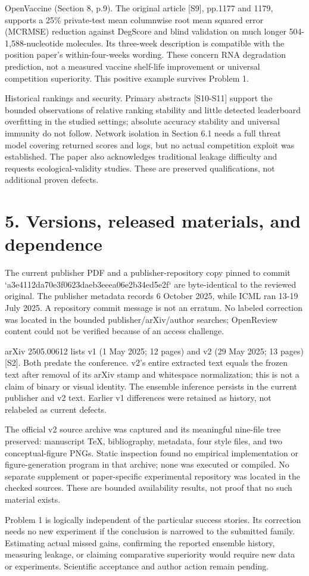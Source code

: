 \documentclass[10pt]{article}
\begin{document}
OpenVaccine (Section 8, p.9). The original article [S9], pp.1177 and 1179, supports a 25\% private-test mean columnwise root mean squared error (MCRMSE) reduction against DegScore and blind validation on much longer 504-1,588-nucleotide molecules. Its three-week description is compatible with the position paper’s within-four-weeks wording. These concern RNA degradation prediction, not a measured vaccine shelf-life improvement or universal competition superiority. This positive example survives Problem 1.\par
Historical rankings and security. Primary abstracts [S10-S11] support the bounded observations of relative ranking stability and little detected leaderboard overfitting in the studied settings; absolute accuracy stability and universal immunity do not follow. Network isolation in Section 6.1 needs a full threat model covering returned scores and logs, but no actual competition exploit was established. The paper also acknowledges traditional leakage difficulty and requests ecological-validity studies. These are preserved qualifications, not additional proven defects.\par
\section*{5. Versions, released materials, and dependence}
The current publisher PDF and a publisher-repository copy pinned to commit `a3e4112da70e3f0623daeb3eeea06e2b34ed5e2f` are byte-identical to the reviewed original. The publisher metadata records 6 October 2025, while ICML ran 13-19 July 2025. A repository commit message is not an erratum. No labeled correction was located in the bounded publisher/arXiv/author searches; OpenReview content could not be verified because of an access challenge.\par
arXiv 2505.00612 lists v1 (1 May 2025; 12 pages) and v2 (29 May 2025; 13 pages) [S2]. Both predate the conference. v2’s entire extracted text equals the frozen text after removal of its arXiv stamp and whitespace normalization; this is not a claim of binary or visual identity. The ensemble inference persists in the current publisher and v2 text. Earlier v1 differences were retained as history, not relabeled as current defects.\par
The official v2 source archive was captured and its meaningful nine-file tree preserved: manuscript TeX, bibliography, metadata, four style files, and two conceptual-figure PNGs. Static inspection found no empirical implementation or figure-generation program in that archive; none was executed or compiled. No separate supplement or paper-specific experimental repository was located in the checked sources. These are bounded availability results, not proof that no such material exists.\par
Problem 1 is logically independent of the particular success stories. Its correction needs no new experiment if the conclusion is narrowed to the submitted family. Estimating actual missed gains, confirming the reported ensemble history, measuring leakage, or claiming comparative superiority would require new data or experiments. Scientific acceptance and author action remain pending.\par
\end{document}
